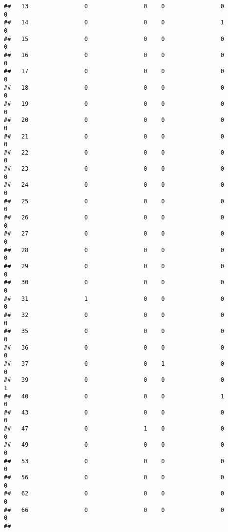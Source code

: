 \documentclass[]{article}
\begin{document}
\begin{verbatim}
##   13                0                0    0                0                0
##   14                0                0    0                1                0
##   15                0                0    0                0                0
##   16                0                0    0                0                0
##   17                0                0    0                0                0
##   18                0                0    0                0                0
##   19                0                0    0                0                0
##   20                0                0    0                0                0
##   21                0                0    0                0                0
##   22                0                0    0                0                0
##   23                0                0    0                0                0
##   24                0                0    0                0                0
##   25                0                0    0                0                0
##   26                0                0    0                0                0
##   27                0                0    0                0                0
##   28                0                0    0                0                0
##   29                0                0    0                0                0
##   30                0                0    0                0                0
##   31                1                0    0                0                0
##   32                0                0    0                0                0
##   35                0                0    0                0                0
##   36                0                0    0                0                0
##   37                0                0    1                0                0
##   39                0                0    0                0                1
##   40                0                0    0                1                0
##   43                0                0    0                0                0
##   47                0                1    0                0                0
##   49                0                0    0                0                0
##   53                0                0    0                0                0
##   56                0                0    0                0                0
##   62                0                0    0                0                0
##   66                0                0    0                0                0
##     

\end{verbatim}
\end{document}
